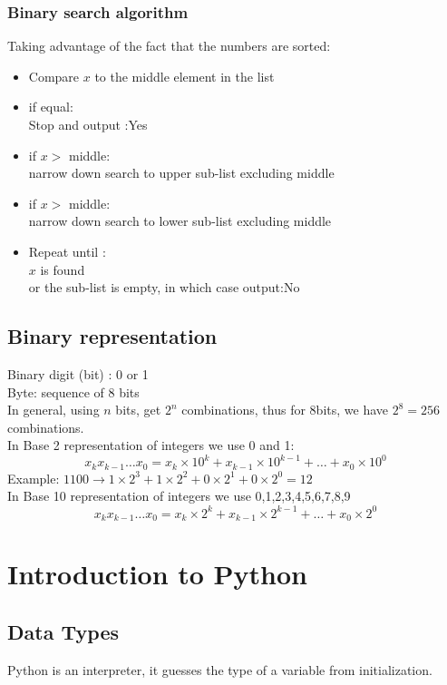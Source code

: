 \documentclass[12pt,oneside]{book}
\begin{document}
\subsection{Binary search algorithm}
Taking advantage of the fact that the numbers are sorted:
\begin{itemize}
	\item Compare $x$ to the middle element in the list
	\item if equal:\\
	      Stop and output :Yes
	\item if $x>$ middle:\\
	      narrow down search to upper sub-list excluding middle
	\item if $x>$ middle:\\
	      narrow down search to lower sub-list excluding middle
	\item Repeat until :\\
	      $x$ is found \\
	      or the sub-list is empty, in which case output:No
\end{itemize}
\section{Binary representation}

Binary digit (bit) : 0 or 1 \\
Byte: sequence of 8 bits\\
In general, using $n$ bits,  get $2^n$ combinations, thus for 8bits, we have $2^8 = 256$ combinations.\\

In Base 2 representation of integers we use 0 and 1:
\[ x_kx_{k-1}\dots x_0 = x_k\times10^k+x_{k-1}\times 10^{k-1}+\dots+x_0\times 10^0 \]
Example: $1100\to1\times2^3 + 1\times2^2 + 0\times 2^1+0\times 2^0 = 12$\\

In Base 10 representation of integers we use 0,1,2,3,4,5,6,7,8,9\\
\[ x_kx_{k-1}\dots x_0 = x_k\times2^k+x_{k-1}\times 2^{k-1}+\dots+x_0\times 2^0 \]
\chapter{Introduction to Python}
\section{Data Types}
Python is an interpreter, it guesses the type of a variable from initialization.
\end{document}
